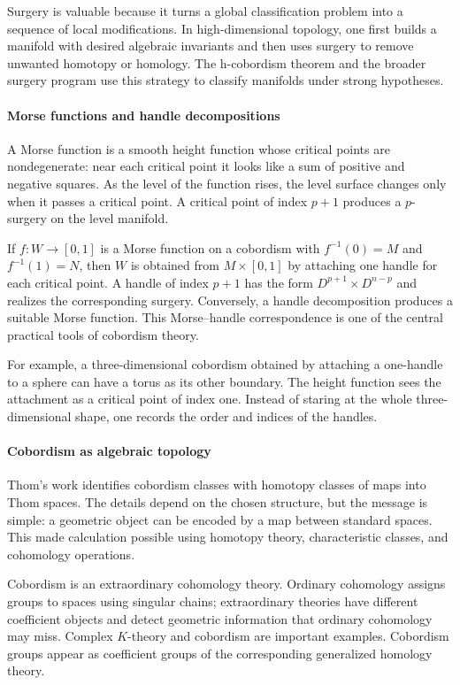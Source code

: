 Surgery is valuable because it turns a global classification problem into a sequence of local modifications. In high-dimensional topology, one first builds a manifold with desired algebraic invariants and then uses surgery to remove unwanted homotopy or homology. The h-cobordism theorem and the broader surgery program use this strategy to classify manifolds under strong hypotheses.

\paragraph{Morse functions and handle decompositions}

A Morse function is a smooth height function whose critical points are nondegenerate: near each critical point it looks like a sum of positive and negative squares. As the level of the function rises, the level surface changes only when it passes a critical point. A critical point of index $p+1$ produces a $p$-surgery on the level manifold.

If $f:W\to[0,1]$ is a Morse function on a cobordism with $f^{-1}(0)=M$ and $f^{-1}(1)=N$, then $W$ is obtained from $M\times[0,1]$ by attaching one handle for each critical point. A handle of index $p+1$ has the form $D^{p+1}\times D^{n-p}$ and realizes the corresponding surgery. Conversely, a handle decomposition produces a suitable Morse function. This Morse--handle correspondence is one of the central practical tools of cobordism theory. \cite{cobordism_theory_ref1,cobordism_theory_ref7}

For example, a three-dimensional cobordism obtained by attaching a one-handle to a sphere can have a torus as its other boundary. The height function sees the attachment as a critical point of index one. Instead of staring at the whole three-dimensional shape, one records the order and indices of the handles.

\paragraph{Cobordism as algebraic topology}

Thom's work identifies cobordism classes with homotopy classes of maps into Thom spaces. The details depend on the chosen structure, but the message is simple: a geometric object can be encoded by a map between standard spaces. This made calculation possible using homotopy theory, characteristic classes, and cohomology operations.

Cobordism is an extraordinary cohomology theory. Ordinary cohomology assigns groups to spaces using singular chains; extraordinary theories have different coefficient objects and detect geometric information that ordinary cohomology may miss. Complex $K$-theory and cobordism are important examples. Cobordism groups appear as coefficient groups of the corresponding generalized homology theory. \cite{cobordism_theory_ref4,cobordism_theory_ref6}

